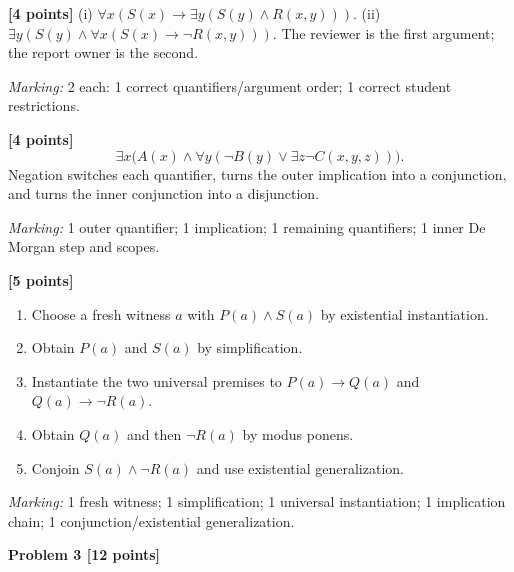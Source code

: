 \documentclass[12pt,letterpaper]{article}
\newcommand{\problemheading}[2][5\baselineskip]{\Needspace{#1}\par\noindent\hspace*{-0.625in}\textbf{#2}\par\nobreak\vspace{0.3em}}
\begin{document}
\begin{description}[font=\normalfont,leftmargin=1.2em,labelsep=0.4em]
\item[(a)] \textbf{[4 points]} (i) $\forall x(S(x)\to\exists y(S(y)\land R(x,y)))$. (ii) $\exists y(S(y)\land\forall x(S(x)\to\neg R(x,y)))$. The reviewer is the first argument; the report owner is the second.
\par\textit{Marking:} 2 each: 1 correct quantifiers/argument order; 1 correct student restrictions.
\item[(b)] \textbf{[4 points]} \[\exists x\bigl(A(x)\land\forall y(\neg B(y)\lor\exists z\neg C(x,y,z))\bigr).\] Negation switches each quantifier, turns the outer implication into a conjunction, and turns the inner conjunction into a disjunction.
\par\textit{Marking:} 1 outer quantifier; 1 implication; 1 remaining quantifiers; 1 inner De Morgan step and scopes.
\item[(c)] \textbf{[5 points]} \begin{enumerate}\item Choose a fresh witness $a$ with $P(a)\land S(a)$ by existential instantiation.\item Obtain $P(a)$ and $S(a)$ by simplification.\item Instantiate the two universal premises to $P(a)\to Q(a)$ and $Q(a)\to\neg R(a)$.\item Obtain $Q(a)$ and then $\neg R(a)$ by modus ponens.\item Conjoin $S(a)\land\neg R(a)$ and use existential generalization.\end{enumerate}
\par\textit{Marking:} 1 fresh witness; 1 simplification; 1 universal instantiation; 1 implication chain; 1 conjunction/existential generalization.
\end{description}
\vspace{0.65em}
\problemheading[\dimexpr 3\baselineskip+4\baselineskip\relax]{Problem 3 [12 points]}
\end{document}
